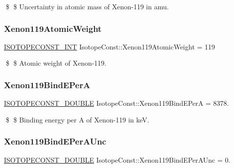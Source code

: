 \$ \$ Uncertainty in atomic mass of Xenon-\/119 in amu. \mbox{\label{group___isotope_const-_xenon-_xe119_gacf0f4448949388f241f04b2992286f0a}} 
\subsubsection{\texorpdfstring{Xenon119\+Atomic\+Weight}{Xenon119AtomicWeight}}
{\footnotesize\ttfamily \mbox{\hyperlink{group___isotope_const-_macros_ga5f18360b3e99483a35c32d789e62621c}{I\+S\+O\+T\+O\+P\+E\+C\+O\+N\+S\+T\+\_\+\+I\+NT}} Isotope\+Const\+::\+Xenon119\+Atomic\+Weight = 119}

\$ \$ Atomic weight of Xenon-\/119. \mbox{\label{group___isotope_const-_xenon-_xe119_ga3085e5787193aea13cb4ae979106ba4e}} 
\subsubsection{\texorpdfstring{Xenon119\+Bind\+E\+PerA}{Xenon119BindEPerA}}
{\footnotesize\ttfamily \mbox{\hyperlink{group___isotope_const-_macros_ga8f45a7272ce02c0b4c65c44636ed719a}{I\+S\+O\+T\+O\+P\+E\+C\+O\+N\+S\+T\+\_\+\+D\+O\+U\+B\+LE}} Isotope\+Const\+::\+Xenon119\+Bind\+E\+PerA = 8378.}

\$ \$ Binding energy per A of Xenon-\/119 in keV. \mbox{\label{group___isotope_const-_xenon-_xe119_gaf0dfd31054935e0c2676a1711c2421db}} 
\subsubsection{\texorpdfstring{Xenon119\+Bind\+E\+Per\+A\+Unc}{Xenon119BindEPerAUnc}}
{\footnotesize\ttfamily \mbox{\hyperlink{group___isotope_const-_macros_ga8f45a7272ce02c0b4c65c44636ed719a}{I\+S\+O\+T\+O\+P\+E\+C\+O\+N\+S\+T\+\_\+\+D\+O\+U\+B\+LE}} Isotope\+Const\+::\+Xenon119\+Bind\+E\+Per\+A\+Unc = 0.}

